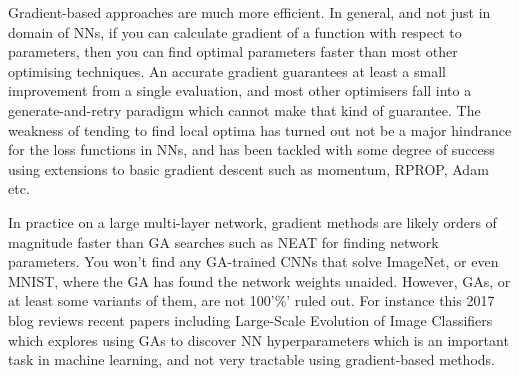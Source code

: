  Gradient-based approaches are much more efficient. In general, and not just in domain of NNs, if you can calculate gradient of a function with respect to parameters, then you can find optimal parameters faster than most other optimising techniques. An accurate gradient guarantees at least a small improvement from a single evaluation, and most other optimisers fall into a generate-and-retry paradigm which cannot make that kind of guarantee. The weakness of tending to find local optima has turned out not be a major hindrance for the loss functions in NNs, and has been tackled with some degree of success using extensions to basic gradient descent such as momentum, RPROP, Adam etc.

 In practice on a large multi-layer network, gradient methods are likely orders of magnitude faster than GA searches such as NEAT for finding network parameters. You won't find any GA-trained CNNs that solve ImageNet, or even MNIST, where the GA has found the network weights unaided. However, GAs, or at least some variants of them, are not 100'\%' ruled out. For instance this 2017 blog reviews recent papers including Large-Scale Evolution of Image Classifiers which explores using GAs to discover NN hyperparameters which is an important task in machine learning, and not very tractable using gradient-based methods.
